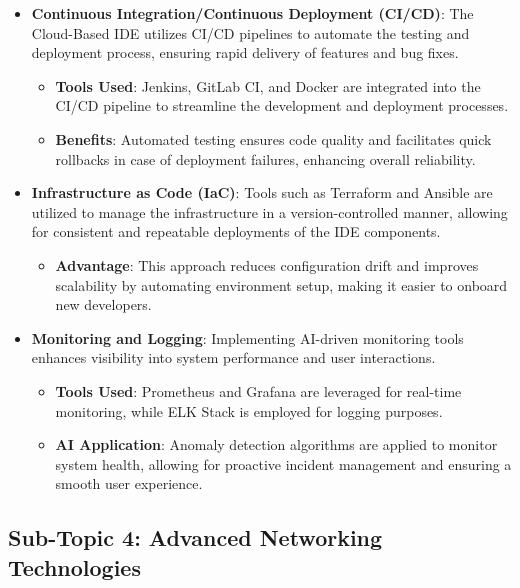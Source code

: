 \documentclass[12pt,a4paper,final]{report}
\begin{document}
\begin{itemize}
    \item \textbf{Continuous Integration/Continuous Deployment (CI/CD)}: The Cloud-Based IDE utilizes CI/CD pipelines to automate the testing and deployment process, ensuring rapid delivery of features and bug fixes. 
    \begin{itemize}
        \item \textbf{Tools Used}: Jenkins, GitLab CI, and Docker are integrated into the CI/CD pipeline to streamline the development and deployment processes.
        \item \textbf{Benefits}: Automated testing ensures code quality and facilitates quick rollbacks in case of deployment failures, enhancing overall reliability.
    \end{itemize}

    \item \textbf{Infrastructure as Code (IaC)}: Tools such as Terraform and Ansible are utilized to manage the infrastructure in a version-controlled manner, allowing for consistent and repeatable deployments of the IDE components.
    \begin{itemize}
        \item \textbf{Advantage}: This approach reduces configuration drift and improves scalability by automating environment setup, making it easier to onboard new developers.
    \end{itemize}

    \item \textbf{Monitoring and Logging}: Implementing AI-driven monitoring tools enhances visibility into system performance and user interactions.
    \begin{itemize}
        \item \textbf{Tools Used}: Prometheus and Grafana are leveraged for real-time monitoring, while ELK Stack is employed for logging purposes.
        \item \textbf{AI Application}: Anomaly detection algorithms are applied to monitor system health, allowing for proactive incident management and ensuring a smooth user experience.
    \end{itemize}
\end{itemize}

\subsection{Sub-Topic 4: Advanced Networking Technologies}
\end{document}
